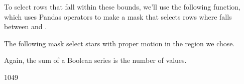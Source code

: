 \documentclass[letterpaper,10pt,english]{sphinxmanual}
\begin{document}
\noindent{}

To select rows that fall within these bounds, we’ll use the following function, which uses Pandas operators to make a mask that selects rows where  falls between  and .

\begin{sphinxVerbatim}[commandchars=\\\{\}]
   
           
\end{sphinxVerbatim}

The following mask select stars with proper motion in the region we chose.

\begin{sphinxVerbatim}[commandchars=\\\{\}]
  \PYG{p}{[}\PYG{p}{]}    
           \PYG{p}{[}\PYG{p}{]}  
\end{sphinxVerbatim}

Again, the sum of a Boolean series is the number of  values.

\begin{sphinxVerbatim}[commandchars=\\\{\}]
\end{sphinxVerbatim}

\begin{sphinxVerbatim}[commandchars=\\\{\}]
1049
\end{sphinxVerbatim}
\end{document}
